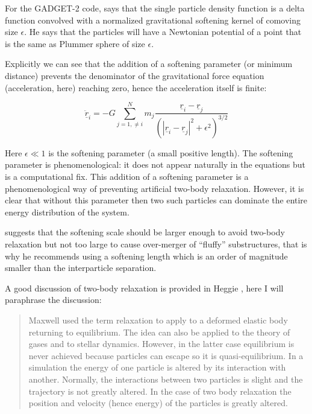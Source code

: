 For the GADGET-2 code, \citet{bib_spr} says that the single particle density function is a delta function convolved with a normalized gravitational softening kernel of comoving size $\epsilon$. He says that the particles will have a Newtonian potential of a point that is the same as Plummer sphere of size $\epsilon$.

Explicitly we can see that the addition of a softening parameter (or minimum distance) prevents the denominator of the gravitational force equation (acceleration, here) reaching zero, hence the acceleration itself is finite:

\begin{equation}
\ddot{\underline{r}}_i = -G \sum_{j = 1,\ne i}^N m_j \frac{\underline{r}_i -\underline{r}_j}{(|\underline{r}_i - \underline{r}_j|^2 + \epsilon^2)^{3/2}}
\end{equation}

\noindent Here $\epsilon \ll 1$ is the softening parameter (a small positive length). The softening parameter is phenomenological: it does not appear naturally in the equations but is a computational fix. This addition of a softening parameter is a phenomenological way of preventing artificial two-body relaxation. However, it is clear that without this parameter then two such particles can dominate the entire energy distribution of the system.

\citet{bib_hmpc3} suggests that the softening scale should be larger enough to avoid two-body relaxation but not too large to cause over-merger of ``fluffy'' substructures, that is why he recommends using a softening length which is an order of magnitude smaller than the interparticle separation.

A good discussion of two-body relaxation is provided in Heggie \citep{bib_heg}, here I will paraphrase the discussion:

\begin{quote}
Maxwell used the term relaxation to apply to a deformed elastic body returning to equilibrium. The idea can also be applied to the theory of gases and to stellar dynamics. However, in the latter case equilibrium is never achieved because particles can escape so it is quasi-equilibrium. In a simulation the energy of one particle is altered by its interaction with another. Normally, the interactions between two particles is slight and the trajectory is not greatly altered. In the case of two body relaxation the position and velocity (hence energy) of the particles is greatly altered.
\end{quote}

